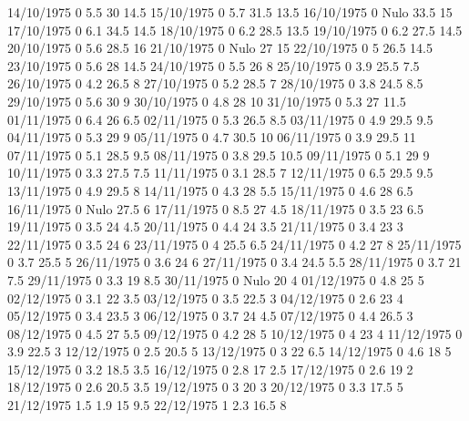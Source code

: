 14/10/1975  0      5.5    30     14.5 
15/10/1975  0      5.7    31.5   13.5 
16/10/1975  0     Nulo    33.5   15 
17/10/1975  0      6.1    34.5   14.5 
18/10/1975  0      6.2    28.5   13.5 
19/10/1975  0      6.2    27.5   14.5 
20/10/1975  0      5.6    28.5   16 
21/10/1975  0     Nulo    27     15 
22/10/1975  0      5      26.5   14.5 
23/10/1975  0      5.6    28     14.5 
24/10/1975  0      5.5    26     8 
25/10/1975  0      3.9    25.5   7.5 
26/10/1975  0      4.2    26.5   8 
27/10/1975  0      5.2    28.5   7 
28/10/1975  0      3.8    24.5   8.5 
29/10/1975  0      5.6    30     9 
30/10/1975  0      4.8    28     10 
31/10/1975  0      5.3    27     11.5 
01/11/1975  0      6.4    26     6.5 
02/11/1975  0      5.3    26.5   8.5 
03/11/1975  0      4.9    29.5   9.5 
04/11/1975  0      5.3    29     9 
05/11/1975  0      4.7    30.5   10 
06/11/1975  0      3.9    29.5   11 
07/11/1975  0      5.1    28.5   9.5 
08/11/1975  0      3.8    29.5   10.5 
09/11/1975  0      5.1    29     9 
10/11/1975  0      3.3    27.5   7.5 
11/11/1975  0      3.1    28.5   7 
12/11/1975  0      6.5    29.5   9.5 
13/11/1975  0      4.9    29.5   8 
14/11/1975  0      4.3    28     5.5 
15/11/1975  0      4.6    28     6.5 
16/11/1975  0     Nulo    27.5   6 
17/11/1975  0      8.5    27     4.5 
18/11/1975  0      3.5    23     6.5 
19/11/1975  0      3.5    24     4.5 
20/11/1975  0      4.4    24     3.5 
21/11/1975  0      3.4    23     3 
22/11/1975  0      3.5    24     6 
23/11/1975  0      4      25.5   6.5 
24/11/1975  0      4.2    27     8 
25/11/1975  0      3.7    25.5   5 
26/11/1975  0      3.6    24     6 
27/11/1975  0      3.4    24.5   5.5 
28/11/1975  0      3.7    21     7.5 
29/11/1975  0      3.3    19     8.5 
30/11/1975  0     Nulo    20     4 
01/12/1975  0      4.8    25     5 
02/12/1975  0      3.1    22     3.5 
03/12/1975  0      3.5    22.5   3 
04/12/1975  0      2.6    23     4 
05/12/1975  0      3.4    23.5   3 
06/12/1975  0      3.7    24     4.5 
07/12/1975  0      4.4    26.5   3 
08/12/1975  0      4.5    27     5.5 
09/12/1975  0      4.2    28     5 
10/12/1975  0      4      23     4 
11/12/1975  0      3.9    22.5   3 
12/12/1975  0      2.5    20.5   5 
13/12/1975  0      3      22     6.5 
14/12/1975  0      4.6    18     5 
15/12/1975  0      3.2    18.5   3.5 
16/12/1975  0      2.8    17     2.5 
17/12/1975  0      2.6    19     2 
18/12/1975  0      2.6    20.5   3.5 
19/12/1975  0      3      20     3 
20/12/1975  0      3.3    17.5   5 
21/12/1975  1.5    1.9    15     9.5 
22/12/1975  1      2.3    16.5   8 
